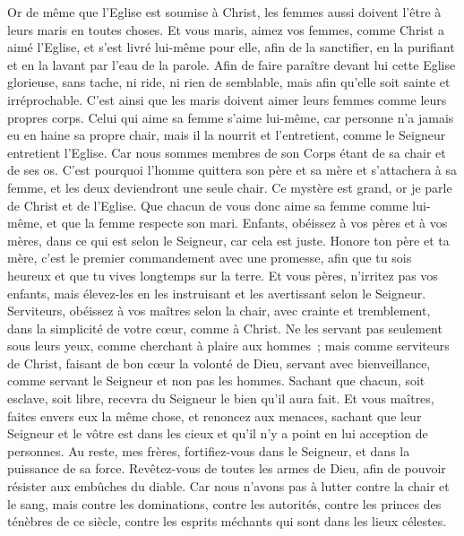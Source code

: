 \begin{multicols}{2}
Or de même que l'Eglise est soumise à Christ, les femmes aussi doivent l'être à leurs maris en toutes choses.
Et vous maris, aimez vos femmes, comme Christ a aimé l'Eglise, et s'est livré lui-même pour elle,
afin de la sanctifier, en la purifiant et en la lavant par l'eau de la parole.
Afin de faire paraître devant lui cette Eglise glorieuse, sans tache, ni ride, ni rien de semblable, mais afin qu'elle soit sainte et irréprochable.
C'est ainsi que les maris doivent aimer leurs femmes comme leurs propres corps. Celui qui aime sa femme s'aime lui-même,
car personne n'a jamais eu en haine sa propre chair, mais il la nourrit et l'entretient, comme le Seigneur entretient l'Eglise.
Car nous sommes membres de son Corps étant de sa chair et de ses os.
C'est pourquoi l'homme quittera son père et sa mère et s'attachera à sa femme, et les deux deviendront une seule chair.
Ce mystère est grand, or je parle de Christ et de l'Eglise.
Que chacun de vous donc aime sa femme comme lui-même, et que la femme respecte son mari.
\VerseOne{}Enfants, obéissez à vos pères et à vos mères, dans ce qui est selon le Seigneur, car cela est juste.
Honore ton père et ta mère, c'est le premier commandement avec une promesse,
afin que tu sois heureux et que tu vives longtemps sur la terre.
Et vous pères, n'irritez pas vos enfants, mais élevez-les en les instruisant et les avertissant selon le Seigneur.
Serviteurs, obéissez à vos maîtres selon la chair, avec crainte et tremblement, dans la simplicité de votre cœur, comme à Christ.
Ne les servant pas seulement sous leurs yeux, comme cherchant à plaire aux hommes~; mais comme serviteurs de Christ, faisant de bon cœur la volonté de Dieu,
servant avec bienveillance, comme servant le Seigneur et non pas les hommes.
Sachant que chacun, soit esclave, soit libre, recevra du Seigneur le bien qu'il aura fait.
Et vous maîtres, faites envers eux la même chose, et renoncez aux menaces, sachant que leur Seigneur et le vôtre est dans les cieux et qu'il n'y a point en lui acception de personnes.
Au reste, mes frères, fortifiez-vous dans le Seigneur, et dans la puissance de sa force.
Revêtez-vous de toutes les armes de Dieu, afin de pouvoir résister aux embûches du diable.
Car nous n'avons pas à lutter contre la chair et le sang, mais contre les dominations, contre les autorités, contre les princes des ténèbres de ce siècle, contre les esprits méchants qui sont dans les lieux célestes.

\end{multicols}
